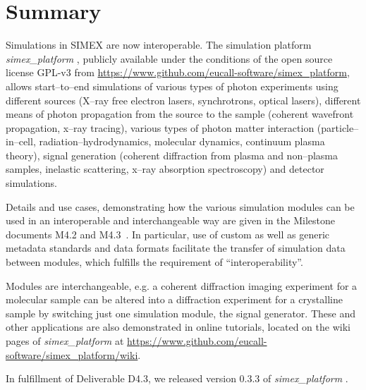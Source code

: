 \documentclass[10pt]{scrartcl}
\begin{document}

\section{Summary}
%
Simulations in SIMEX are now interoperable. The simulation platform
\textit{simex\_platform}
\cite{Fortmann-Grote2016b,Fortmann-Grote2017a,simex_github}, publicly available under the conditions of the open source
license GPL-v3 \cite{gplv3} from
\href{https://www.github.com/eucall-software/simex_platform}{https://www.github.com/eucall-software/simex\_platform},
allows start--to--end simulations of various types of photon experiments using
different sources (X--ray free electron lasers, synchrotrons, optical lasers),
different means of photon propagation from the source to the sample (coherent
wavefront propagation, x--ray tracing), various types of photon matter
interaction (particle--in--cell, radiation--hydrodynamics, molecular dynamics,
continuum plasma theory), signal generation (coherent diffraction from plasma
and non--plasma samples, inelastic scattering, x--ray absorption spectroscopy)
and detector simulations.

Details and use cases, demonstrating how the various
simulation modules can be used in an interoperable and interchangeable way are
given in the Milestone documents M4.2 \cite{EUCALL_SIMEX_M4.2} and
M4.3~\cite{EUCALL_SIMEX_M4.3}. In particular, use of custom as well as generic
metadata standards and data formats facilitate the transfer of simulation data
between modules, which fulfills the requirement of ``interoperability''.

Modules are interchangeable, e.g. a coherent diffraction
imaging experiment for a molecular sample can be altered into a diffraction
experiment for a crystalline sample by switching just one
simulation module, the signal generator.
These and other applications are also demonstrated in online tutorials, located
on the wiki pages of \textit{simex\_platform} at
\href{https://www.github.com/eucall-software/simex_platform/wiki}{https://www.github.com/eucall-software/simex\_platform/wiki}.

In fulfillment of Deliverable D4.3, we released version 0.3.3 of
\textit{simex\_platform} \cite{simex0.3.3}.

\printbibliography
\end{document}
